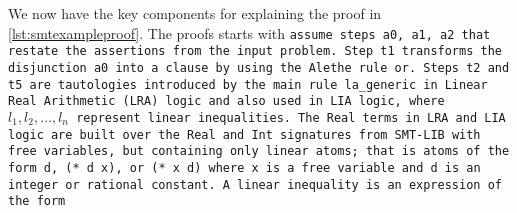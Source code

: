 We now have the key components for explaining the proof in \cref{lst:smtexampleproof}.
The proofs starts with \tt{assume} steps \tt{a0}, \tt{a1}, \tt{a2} that restate the assertions from the input problem. %
Step \tt{t1} transforms the disjunction \texttt{a0} into a clause by using the Alethe rule \tt{or}.
Steps \tt{t2} and \tt{t5} are tautologies introduced by the main rule \tt{la\_generic}
in Linear Real Arithmetic (LRA) logic and also used in LIA logic, where \colorbox{green!30}{$l_1, l_2,\dots, l_n$} represent linear inequalities.
The \lstinline[language=SMT,basicstyle=\ttfamily\footnotesize]{Real} terms in LRA and LIA logic are built over the \lstinline[language=SMT,basicstyle=\ttfamily\footnotesize]{Real} and \lstinline[language=SMT,basicstyle=\ttfamily\footnotesize]{Int} signatures from SMT-LIB with free variables, but containing only linear atoms; that is
atoms of the form \lstinline[language=SMT,basicstyle=\ttfamily\footnotesize]{d}, \lstinline[language=SMT,basicstyle=\ttfamily\footnotesize]{(* d x)}, or \lstinline[language=SMT,basicstyle=\ttfamily\footnotesize]{(* x d)}  where \lstinline[language=SMT,basicstyle=\ttfamily\footnotesize]{x} is a free variable and  \lstinline[language=SMT,basicstyle=\ttfamily\footnotesize]{d} is an integer or rational constant.
A linear inequality is an expression of the form

